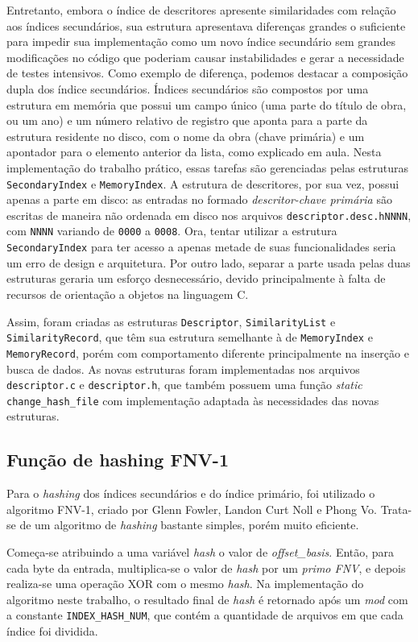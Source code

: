 \documentclass[a4paper,10pt]{article}
\begin{document}
Entretanto, embora o índice de descritores apresente similaridades com relação aos índices secundários, sua estrutura apresentava diferenças grandes o suficiente para impedir sua implementação como um novo índice secundário sem grandes modificações no código que poderiam causar instabilidades e gerar a necessidade de testes intensivos. Como exemplo de diferença, podemos destacar a composição dupla dos índice secundários. Índices secundários são compostos por uma estrutura em memória que possui um campo único (uma parte do título de obra, ou um ano) e um número relativo de registro que aponta para a parte da estrutura residente no disco, com o nome da obra (chave primária) e um apontador para o elemento anterior da lista, como explicado em aula. Nesta implementação do trabalho prático, essas tarefas são gerenciadas pelas estruturas \texttt{SecondaryIndex} e \texttt{MemoryIndex}. A estrutura de descritores, por sua vez, possui apenas a parte em disco: as entradas no formado \textit{descritor-chave primária} são escritas de maneira não ordenada em disco nos arquivos \texttt{descriptor.desc.hNNNN}, com \texttt{NNNN} variando de \texttt{0000} a \texttt{0008}. Ora, tentar utilizar a estrutura \texttt{SecondaryIndex} para ter acesso a apenas metade de suas funcionalidades seria um erro de design e arquitetura. Por outro lado, separar a parte usada pelas duas estruturas geraria um esforço desnecessário, devido principalmente à falta de recursos de orientação a objetos na linguagem C.

Assim, foram criadas as estruturas \texttt{Descriptor}, \texttt{SimilarityList} e \texttt{SimilarityRecord}, que têm sua estrutura semelhante à de \texttt{MemoryIndex} e \texttt{MemoryRecord}, porém com comportamento diferente principalmente na inserção e busca de dados. As novas estruturas foram implementadas nos arquivos \texttt{descriptor.c} e \texttt{descriptor.h}, que também possuem uma função \textit{static} \texttt{change\_hash\_file} com implementação adaptada às necessidades das novas estruturas.

\subsection{Função de hashing FNV-1}\label{fnv1}
Para o \textit{hashing} dos índices secundários e do índice primário, foi utilizado o algoritmo FNV-1, criado por Glenn Fowler, Landon Curt Noll e Phong Vo. Trata-se de um algoritmo de \textit{hashing} bastante simples, porém muito eficiente.

Começa-se atribuindo a uma variável \textit{hash} o valor de \textit{offset\_basis}. Então, para cada byte da entrada, multiplica-se o valor de \textit{hash} por um \textit{primo FNV}, e depois realiza-se uma operação XOR com o mesmo \textit{hash}. Na implementação do algoritmo neste trabalho, o resultado final de \textit{hash} é retornado após um \textit{mod} com a constante \texttt{INDEX\_HASH\_NUM}, que contém a quantidade de arquivos em que cada índice foi dividida.
\end{document}
